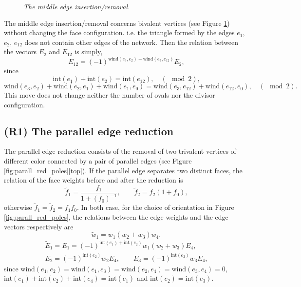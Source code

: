 \documentclass[11pt]{amsart}
\theoremstyle{plain}
\numberwithin{equation}{section}
\begin{document}
\begin{figure}%
	\vspace{-.5 truecm}
  \caption{\small{\sl The middle edge insertion/removal.}\label{fig:middle}}
\end{figure}

The middle edge insertion/removal concerns bivalent vertices (see Figure \ref{fig:middle}) without changing the face configuration. i.e. the triangle formed by the edges $e_1$, $e_2$, $e_{12}$ does not contain other edges of the network. Then the relation between the vectors $E_2$ and $E_{12}$ is simply, 
\[
E_{12} =(-1)^{\mbox{wind}(e_3, e_2) -\mbox{wind}(e_3, e_{12})} E_2,
\]
since
\[
\mbox{int} (e_1) +\mbox{int} (e_2) = \mbox{int} (e_{12}), \quad (\!\!\!\!\!\!\mod 2), 
\]
\[
\mbox{wind}(e_3, e_2) +\mbox{wind}(e_2, e_1)+\mbox{wind}(e_1, e_0) =\mbox{wind}(e_3, e_{12}) +\mbox{wind}(e_{12}, e_0), \quad (\!\!\!\!\!\!\mod 2).
\]
This move does not change neither the number of ovals nor the divisor configuration.

\subsection{(R1) The parallel edge reduction}\label{sec:par_dip}

The parallel edge reduction consists of the removal of two trivalent vertices of different color connected by a pair of parallel edges (see Figure \ref{fig:parall_red_poles}[top]). If the parallel edge separates two distinct faces, the relation of the face weights before and after the reduction is \cite{Pos}
\[
{\tilde f}_1 = \frac{f_1}{1+(f_0)^{-1}}, \quad\quad {\tilde f}_2 = f_2 (1+f_0),
\]
otherwise ${\tilde f}_1 = {\tilde f}_2 = f_1 f_0$. In both case, for the choice of orientation in Figure \ref{fig:parall_red_poles}, the relations between the edge weights and the edge vectors respectively are 
\[
{\tilde w}_1 = w_1(w_2+w_3)w_4,
\]
\begin{equation}\label{eq:vectors_paredge}
\begin{array}{l}
\displaystyle {\tilde E}_{1} = E_1 = (-1)^{\mbox{int}(e_1)+\mbox{int}(e_2)}w_1(w_2+w_3) E_4,\\
E_2 = (-1)^{\mbox{int}(e_2)}w_2 E_4, \quad\quad E_3 = (-1)^{\mbox{int}(e_2)}w_3 E_4,
\end{array}
\end{equation}
since $\mbox{wind} (e_1,e_2) =\mbox{wind} (e_1,e_3) =\mbox{wind} (e_2,e_4) =\mbox{wind} (e_3,e_4) =0$, $\mbox{int}(e_1)+\mbox{int}(e_2)+\mbox{int}(e_4) =\mbox{int}({\tilde e}_1)$ and $\mbox{int}(e_2) =\mbox{int}(e_3)$.
\end{document}
